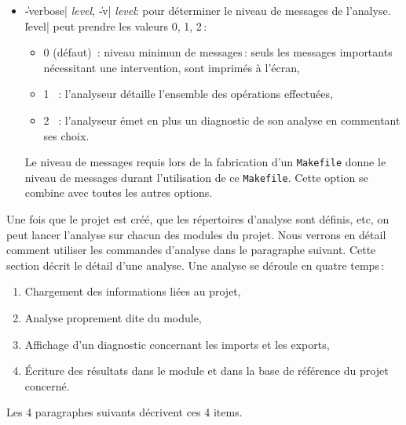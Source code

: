 \begin{itemize}
\item {\Large \|-verbose| {\em level}, \|-v| {\em level}}: pour
d\'{e}terminer le niveau de 
messages de l'analyse. \|level| peut prendre les valeurs 0, 1, 2\,: 
\begin{itemize}
\item 0 (d\'{e}faut)\ :
niveau minimun de messages\,: seuls les messages importants
n\'{e}cessitant une intervention, sont imprim\'{e}s \`{a} l'\'{e}cran,
\item 1 \ :
l'analyseur d\'{e}taille l'ensemble des op\'{e}rations effectu\'{e}es,
\item 2 \ :
l'analyseur \'{e}met en plus un diagnostic de son analyse en commentant
ses choix.
\end{itemize}
Le niveau de messages requis lors de la fabrication d'un {\tt Makefile}
donne le niveau de messages durant l'utilisation de ce {\tt Makefile}.
Cette option se combine avec toutes les autres options.

\end{itemize}


Une fois que le projet est cr\'{e}\'{e}, que les r\'{e}pertoires d'analyse sont
d\'{e}finis, etc, on peut lancer l'analyse sur chacun des modules du
projet.
Nous verrons en d\'{e}tail comment utiliser les commandes d'analyse dans
le paragraphe suivant. Cette section d\'{e}crit le d\'{e}tail d'une analyse.
Une analyse se d\'{e}roule en quatre temps\,:

\begin {enumerate}

\item Chargement des informations li\'{e}es au projet,

\item Analyse proprement dite du module,

\item Affichage d'un diagnostic concernant les imports et les exports,

\item \'{E}criture des r\'{e}sultats dans le module et dans la base de
r\'{e}f\'{e}rence du projet concern\'{e}.
\end {enumerate}

Les 4 paragraphes suivants d\'{e}crivent ces 4 items.

